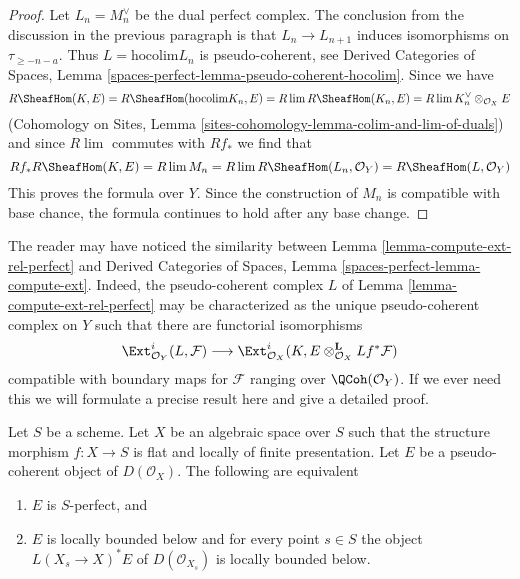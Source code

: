 \begin{proof}
\medskip\noindent
Let $L_n = M_n^\vee$ be the dual perfect complex. The
conclusion from the discussion in the previous paragraph is that
$L_n \to L_{n + 1}$ induces isomorphisms on $\tau_{\geq -n - a}$.
Thus $L = \text{hocolim} L_n$ is pseudo-coherent, see
Derived Categories of Spaces, Lemma
\ref{spaces-perfect-lemma-pseudo-coherent-hocolim}.
Since we have
$$
R\SheafHom(K, E) = R\SheafHom(\text{hocolim} K_n, E) =
R\lim R\SheafHom(K_n, E) = R\lim K_n^\vee \otimes_{\mathcal{O}_X} E
$$
(Cohomology on Sites, Lemma
\ref{sites-cohomology-lemma-colim-and-lim-of-duals})
and since $R\lim$ commutes with $Rf_*$ we find that
$$
Rf_*R\SheafHom(K, E) = R\lim M_n = R\lim R\SheafHom(L_n, \mathcal{O}_Y) =
R\SheafHom(L, \mathcal{O}_Y)
$$
This proves the formula over $Y$. Since the construction of $M_n$ is
compatible with base chance, the formula continues to hold after
any base change.
\end{proof}

\begin{remark}
\label{remark-compare-L}
The reader may have noticed the similarity between
Lemma \ref{lemma-compute-ext-rel-perfect} and
Derived Categories of Spaces, Lemma \ref{spaces-perfect-lemma-compute-ext}.
Indeed, the pseudo-coherent complex $L$ of
Lemma \ref{lemma-compute-ext-rel-perfect}
may be characterized as the unique pseudo-coherent complex
on $Y$ such that there are functorial isomorphisms
$$
\Ext^i_{\mathcal{O}_Y}(L, \mathcal{F}) \longrightarrow
\Ext^i_{\mathcal{O}_X}(K,
E \otimes_{\mathcal{O}_X}^\mathbf{L} Lf^*\mathcal{F})
$$
compatible with boundary maps for $\mathcal{F}$ ranging over
$\QCoh(\mathcal{O}_Y)$. If we ever need this we will
formulate a precise result here and give a detailed proof.
\end{remark}

\begin{lemma}
\label{lemma-bounded-on-fibres}
Let $S$ be a scheme. Let $X$ be an algebraic space over $S$ such that
the structure morphism $f : X \to S$ is flat and
locally of finite presentation. Let $E$ be a pseudo-coherent
object of $D(\mathcal{O}_X)$. The following are equivalent
\begin{enumerate}
\item $E$ is $S$-perfect, and
\item $E$ is locally bounded below and for every point $s \in S$
the object $L(X_s \to X)^*E$ of $D(\mathcal{O}_{X_s})$
is locally bounded below.
\end{enumerate}
\end{lemma}

